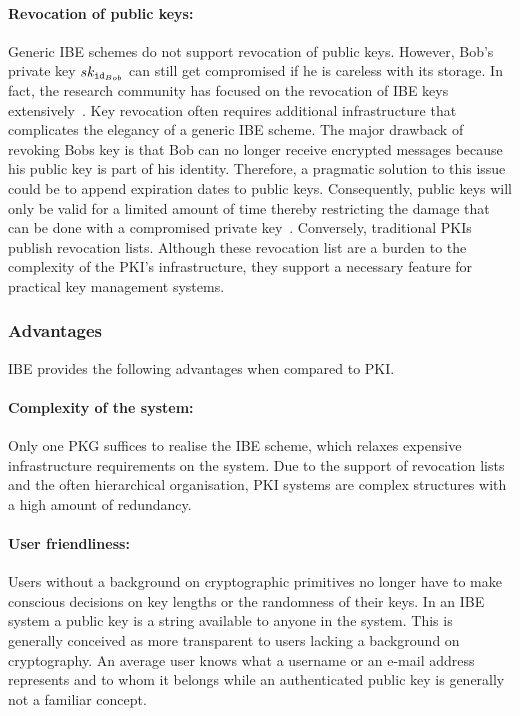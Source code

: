 \paragraph{Revocation of public keys:}
Generic IBE schemes do not support revocation of public keys. However, Bob's private key $sk_{\mathtt{id}_{Bob}}$ can still get compromised if he is careless with its storage. In fact, the research community has focused on the revocation of IBE keys extensively~\cite{art:BoldyrevaGK12,art:BonehDTW01,art:HanaokaHSI05,art:LibertQ03}. Key revocation often requires additional infrastructure that complicates the elegancy of a generic IBE scheme. The major drawback of revoking Bobs key is that Bob can no longer receive encrypted messages because his public key is part of his identity. Therefore, a pragmatic solution to this issue could be to append expiration dates to public keys. Consequently, public keys will only be valid for a limited amount of time thereby restricting the damage that can be done with a compromised private key~\cite{art:BonehF01}. Conversely, traditional PKIs publish revocation lists. Although these revocation list are a burden to the complexity of the PKI's infrastructure, they support a necessary feature for practical key management systems. 

\subsubsection{Advantages}
IBE provides the following advantages when compared to PKI.
\paragraph{Complexity of the system:}
Only one PKG suffices to realise the IBE scheme, which relaxes expensive infrastructure requirements on the system. Due to the support of revocation lists and the often hierarchical organisation, PKI systems are complex structures with a high amount of redundancy.

\paragraph{User friendliness:}
Users without a background on cryptographic primitives no longer have to make conscious decisions on key lengths or the randomness of their keys. In an IBE system a public key is a string available to anyone in the system. This is generally conceived as more transparent to users lacking a background on cryptography. An average user knows what a username or an e-mail address represents and to whom it belongs while an authenticated public key is generally not a familiar concept.

